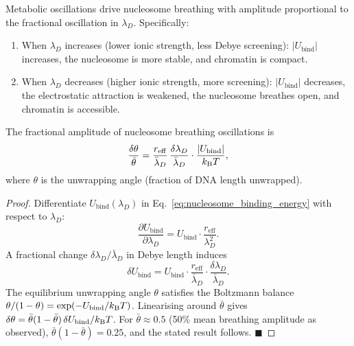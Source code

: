 \begin{theorem}
\label{thm:nucleosome_breathing}
Metabolic oscillations drive nucleosome breathing with amplitude proportional
to the fractional oscillation in $\lambda_D$. Specifically:
\begin{enumerate}[label=(\roman*)]
  \item When $\lambda_D$ increases (lower ionic strength, less Debye
        screening): $|U_{\mathrm{bind}}|$ increases, the nucleosome is more
        stable, and chromatin is compact.
  \item When $\lambda_D$ decreases (higher ionic strength, more screening):
        $|U_{\mathrm{bind}}|$ decreases, the electrostatic attraction is
        weakened, the nucleosome breathes open, and chromatin is accessible.
\end{enumerate}
The fractional amplitude of nucleosome breathing oscillations is
\begin{equation}
  \frac{\delta\theta}{\bar\theta} = \frac{r_{\mathrm{eff}}}{\bar\lambda_D}\,
  \frac{\delta\lambda_D}{\bar\lambda_D} \cdot
  \frac{|U_{\mathrm{bind}}|}{k_{\mathrm{B}} T},
  \label{eq:breathing_amplitude}
\end{equation}
where $\theta$ is the unwrapping angle (fraction of DNA length unwrapped).
\end{theorem}

\begin{proof}
Differentiate $U_{\mathrm{bind}}(\lambda_D)$ in Eq.~\eqref{eq:nucleosome_binding_energy}
with respect to $\lambda_D$:
\begin{equation}
  \frac{\partial U_{\mathrm{bind}}}{\partial\lambda_D} = U_{\mathrm{bind}} \cdot
  \frac{r_{\mathrm{eff}}}{\lambda_D^2}.
\end{equation}
A fractional change $\delta\lambda_D/\bar\lambda_D$ in Debye length induces
\begin{equation}
  \delta U_{\mathrm{bind}} = U_{\mathrm{bind}} \cdot \frac{r_{\mathrm{eff}}}{\bar\lambda_D}
  \cdot \frac{\delta\lambda_D}{\bar\lambda_D}.
\end{equation}
The equilibrium unwrapping angle $\theta$ satisfies the Boltzmann balance
$\theta/(1-\theta) = \exp(-U_{\mathrm{bind}}/k_{\mathrm{B}} T)$. Linearising around
$\bar\theta$ gives $\delta\theta = \bar\theta(1-\bar\theta)\,\delta U_{\mathrm{bind}}/k_{\mathrm{B}} T$.
For $\bar\theta \approx 0.5$ (50\% mean breathing amplitude as observed),
$\bar\theta(1-\bar\theta) = 0.25$, and the stated result follows. $\blacksquare$
\end{proof}

